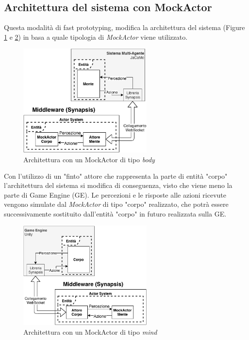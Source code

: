\subsection{Architettura del sistema con MockActor}

Questa modalità di fast prototyping, modifica la architettura del sistema (Figure \ref{mock_actor_body} e \ref{mock_actor_mind}) in basa a quale tipologia di \textit{MockActor} viene utilizzato.

\begin{figure}[H]
\centering
\includegraphics[width=0.6\textwidth]{figures/architettura_mock_actor_body.png}
\caption{Architettura con un MockActor di tipo \textit{body}}
\label{mock_actor_body}
\end{figure}

Con l'utilizzo di un "finto" attore che rappresenta la parte di entità "corpo" l'architettura del sistema si modifica di conseguenza, visto che viene meno la parte di Game Engine (GE). Le percezioni e le risposte alle azioni ricevute vengono simulate dal \textit{MockActor} di tipo "corpo" realizzato, che potrà essere successivamente sostituito dall'entità "corpo" in futuro realizzata sulla GE.

\begin{figure}[H]
\centering
\includegraphics[width=0.6\textwidth]{figures/architettura_mock_actor_mind.png}
\caption{Architettura con un MockActor di tipo \textit{mind}}
\label{mock_actor_mind}
\end{figure}

